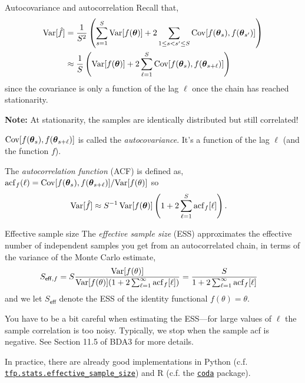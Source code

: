 \documentclass[aspectratio=169]{beamer}
\begin{document}
\begin{frame}{Autocovariance and autocorrelation}
Recall that,
\begin{align}
    \textrm{Var}[\hat{f}] 
    &= \frac{1}{S^2} \left( \sum_{s=1}^S \textrm{Var}[f(\boldsymbol{\theta})] + 2 \sum_{1 \leq s < s' \leq S} \mathrm{Cov} [f(\boldsymbol{\theta}_s),  f(\boldsymbol{\theta}_{s'})] \right) \\
    &\approx \frac{1}{S} \left(\textrm{Var}[f(\boldsymbol{\theta})] + 2\sum_{\ell=1}^{S} \mathrm{Cov} [f(\boldsymbol{\theta}_s),  f(\boldsymbol{\theta}_{s+\ell})] \right)
\end{align}
since the covariance is only a function of the lag $\ell$ once the chain has reached stationarity.

\textbf{Note:} At stationarity, the samples are identically distributed but still correlated!

$\mathrm{Cov} [f(\boldsymbol{\theta}_s),  f(\boldsymbol{\theta}_{s+\ell})] $ is called the \textit{autocovariance}. It's a function of the lag $\ell$ (and the function $f$).

The \textit{autocorrelation function} (ACF) is defined as, $\mathrm{acf}_f(\ell) = \mathrm{Cov} [f(\boldsymbol{\theta}_s),  f(\boldsymbol{\theta}_{s+\ell})] / \textrm{Var}[f(\theta)]$ so
\begin{align}
    \textrm{Var}[\hat{f}] 
    &\approx S^{-1} \, \textrm{Var}[f(\boldsymbol{\theta})] \left(1 + 2\sum_{\ell=1}^{S} \mathrm{acf}_f[\ell] \right).
\end{align}

\end{frame}


\begin{frame}{Effective sample size}
The \textit{effective sample size} (ESS) approximates the effective number of independent samples you get from an autocorrelated chain, in terms of the variance of the Monte Carlo estimate,
\begin{align}
    S_{\mathsf{eff},f} &= S \frac{\textrm{Var}[f(\theta)]}{\textrm{Var}[f(\theta)] ( 1 + 2 \sum_{\ell=1}^\infty \mathrm{acf}_f[\ell]) }
    =  \frac{S}{1 + 2 \sum_{\ell=1}^\infty \mathrm{acf}_f[\ell] }
\end{align}
and we let $S_{\mathsf{eff}}$ denote the ESS of the identity functional $f(\theta)= \theta$.

You have to be a bit careful when estimating the ESS---for large values of $\ell$ the sample correlation is too noisy. Typically, we stop when the sample acf is negative. See Section 11.5 of BDA3 for more details.

In practice, there are already good implementations in Python (c.f. \href{https://www.tensorflow.org/probability/api_docs/python/tfp/mcmc/effective_sample_size}{\texttt{tfp.stats.effective\_sample\_size}}) and R (c.f. the \href{https://cran.r-project.org/web/packages/coda/index.html}{\texttt{coda}} package). 
\end{frame}
\end{document}
